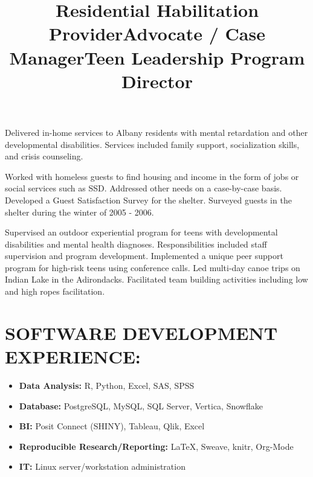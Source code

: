 \documentclass[line, mm, 10pt]{res}
\begin{document}
\begin{resume}
  \title{Residential Habilitation Provider}
  \begin{position}
    Delivered in-home services to Albany residents with mental
    retardation and other developmental disabilities. Services included
    family support, socialization skills, and crisis counseling.
  \end{position}

  \title{Advocate / Case Manager}
  \begin{position}
    Worked with homeless guests to find housing and income in the form of jobs
    or social services such as SSD. Addressed other needs on a case-by-case
    basis. Developed a Guest Satisfaction Survey for the shelter. Surveyed
    guests in the shelter during the winter of 2005 - 2006.
  \end{position}

  \title{Teen Leadership Program Director}
  \begin{position}
    Supervised an outdoor experiential program for teens with
    developmental disabilities and mental health
    diagnoses. Responsibilities included staff supervision and program
    development. Implemented a unique peer support program for
    high-risk teens using conference calls. Led multi-day canoe trips
    on Indian Lake in the Adirondacks. Facilitated team building
    activities including low and high ropes facilitation.
  \end{position}

  \section{SOFTWARE DEVELOPMENT EXPERIENCE:}

  \begin{itemize}
    \item {\bf Data Analysis:} R, Python, Excel, SAS, SPSS
    \item {\bf Database:} PostgreSQL, MySQL, SQL Server, Vertica, Snowflake
    \item {\bf BI:} Posit Connect (SHINY), Tableau, Qlik, Excel 
    \item {\bf Reproducible Research/Reporting:} \LaTeX, Sweave, knitr, Org-Mode
    \item {\bf IT:} Linux server/workstation administration 
  \end{itemize}


\end{resume}
\end{document}
